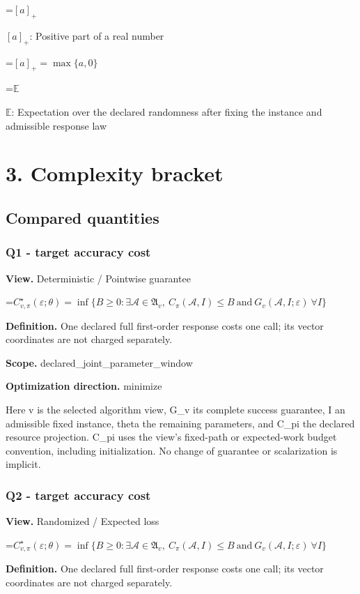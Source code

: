 \documentclass[10pt,a4paper]{article}
\newcommand{\AtlasMath}[1]{\par\begingroup\centering\setbox0=\hbox{$\displaystyle #1$}\ifdim\wd0>1.4\linewidth\typeout{ATLAS WIDE FORMULA: \the\wd0}\fi\ifdim\wd0>\linewidth\resizebox{\linewidth}{!}{\box0}\else\box0\fi\par\endgroup}
\newcommand{\AtlasInlineMath}[1]{\begingroup\setbox0=\hbox{$#1$}\ifdim\wd0>.4\linewidth\endgroup\AtlasMath{#1}\else\endgroup$#1$\fi}
\begin{document}
\AtlasInlineMath{[a]_+}: Positive part of a real number


\AtlasMath{[a]_+=\max\{a,0\}}


\AtlasInlineMath{\mathbb{E}}: Expectation over the declared randomness after fixing the instance and admissible response law

\section{3. Complexity bracket}
\subsection{Compared quantities}
\subsubsection{Q1 - target accuracy cost}
\textbf{View.} Deterministic / Pointwise guarantee

\AtlasMath{C^\star_{v,\pi}(\varepsilon;\theta)=\inf\{B\ge0:\exists\mathcal A\in\mathfrak A_v,\ C_\pi(\mathcal A,I)\le B\ \text{and}\ G_v(\mathcal A,I;\varepsilon)\ \forall I\}}
\textbf{Definition.} One declared full first-order response costs one call; its vector coordinates are not charged separately.

\textbf{Scope.} declared\_joint\_parameter\_window

\textbf{Optimization direction.} minimize

Here v is the selected algorithm view, G\_v its complete success guarantee, I an admissible fixed instance, theta the remaining parameters, and C\_pi the declared resource projection. C\_pi uses the view's fixed-path or expected-work budget convention, including initialization. No change of guarantee or scalarization is implicit.

\subsubsection{Q2 - target accuracy cost}
\textbf{View.} Randomized / Expected loss

\AtlasMath{C^\star_{v,\pi}(\varepsilon;\theta)=\inf\{B\ge0:\exists\mathcal A\in\mathfrak A_v,\ C_\pi(\mathcal A,I)\le B\ \text{and}\ G_v(\mathcal A,I;\varepsilon)\ \forall I\}}
\textbf{Definition.} One declared full first-order response costs one call; its vector coordinates are not charged separately.
\end{document}

